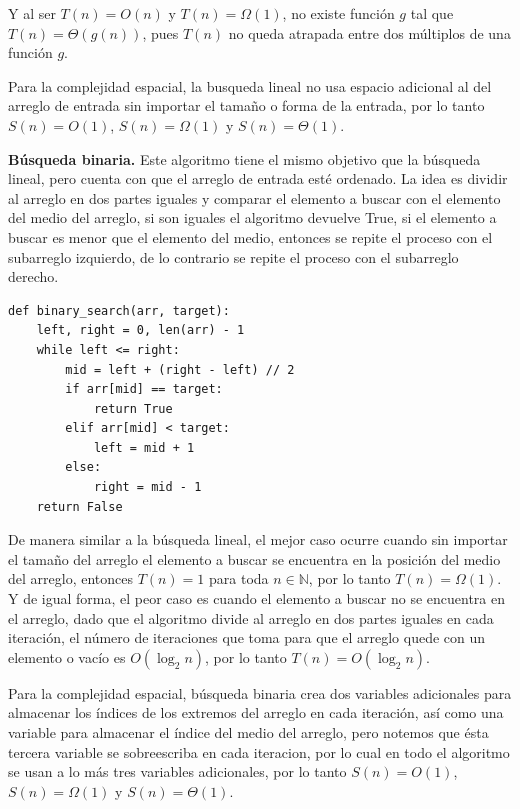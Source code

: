 \documentclass[
 12pt,
 letterpaper,
]{article}
\theoremstyle{teoremaBreak}
\theoremstyle{plain}
\theoremstyle{definition}
\begin{document}
Y al ser $T(n) = O(n)$ y $T(n) = \Omega(1)$, no existe función $g$ tal que $T(n) = \Theta(g(n))$, pues $T(n)$ no queda atrapada entre dos múltiplos de una función $g$.

Para la complejidad espacial, la busqueda lineal no usa espacio adicional al del arreglo de entrada sin importar 
el tamaño o forma de la entrada, por lo tanto $S(n) = O(1)$, $S(n) = \Omega(1)$ y $S(n) = \Theta(1)$.

\textbf{Búsqueda binaria.}
Este algoritmo tiene el mismo objetivo que la búsqueda lineal, pero cuenta con que el arreglo de entrada esté ordenado.
La idea es dividir al arreglo en dos partes iguales y comparar el elemento a buscar con el elemento del medio del arreglo, 
si son iguales el algoritmo devuelve True, si el elemento a buscar es menor que el elemento del medio, entonces se repite 
el proceso con el subarreglo izquierdo, de lo contrario se repite el proceso con el subarreglo derecho.\\
\begin{lstlisting}[style=pseudocodigo]
def binary_search(arr, target):
    left, right = 0, len(arr) - 1
    while left <= right:
        mid = left + (right - left) // 2
        if arr[mid] == target:
            return True
        elif arr[mid] < target:
            left = mid + 1
        else:
            right = mid - 1
    return False
    \end{lstlisting}  

De manera similar a la búsqueda lineal, el mejor caso ocurre cuando sin importar el tamaño del arreglo 
el elemento a buscar se encuentra en la posición del medio del arreglo, entonces $T(n) = 1$ para toda $n \in \mathbb{N}$, 
por lo tanto $T(n) = \Omega(1)$.
Y de igual forma, el peor caso es cuando el elemento a buscar no se encuentra en el arreglo, dado que el algoritmo divide al arreglo 
en dos partes iguales en cada iteración, el número de iteraciones que toma para que el arreglo quede con un elemento o vacío es 
$O(\log_2 n)$, por lo tanto $T(n) = O(\log_2 n)$.

Para la complejidad espacial, búsqueda binaria crea dos variables adicionales para almacenar los índices 
de los extremos del arreglo en cada iteración, así como una variable para almacenar el índice del medio 
del arreglo, pero notemos que ésta tercera variable se sobreescriba en cada iteracion, por lo cual en todo 
el algoritmo se usan a lo más tres variables adicionales, por lo tanto $S(n) = O(1)$, $S(n) = \Omega(1)$ y $S(n) = \Theta(1)$.
\end{document}
